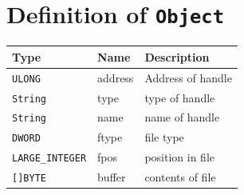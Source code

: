 \documentclass[a4paper, 11pt, english]{report}
\begin{document}
\section{Definition of \texttt{Object}}
\begin{tabular}{p{} p{} p{} }
	\hline
	\textbf{Type} & \textbf{Name} & \textbf{Description } \\
	\hline
	\texttt{ULONG} & address & Address of handle \\
	\texttt{String} & type & type of handle \\
	\texttt{String} & name & name of handle \\
	\texttt{DWORD} & ftype & file type \\
	\texttt{LARGE\_INTEGER} & fpos & position in file \\
	\texttt{[]BYTE} & buffer & contents of file \\
	\hline
\end{tabular}

\printbibliography[heading=bibintoc]


\end{document}
